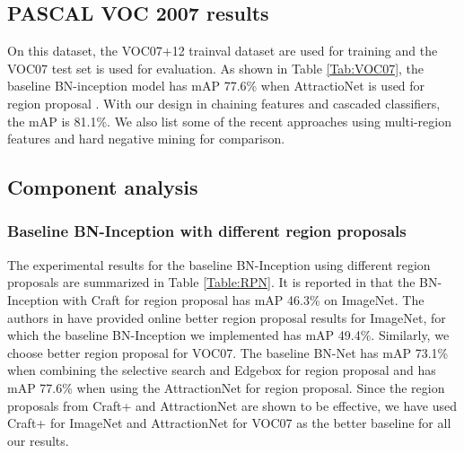 \documentclass[10pt,twocolumn,letterpaper]{article}
\begin{document}
\subsection{PASCAL VOC 2007 results}
On this dataset, the VOC07+12 trainval dataset are used for training and the VOC07 test set is used for evaluation. As shown in Table \ref{Tab:VOC07}, the baseline BN-inception model has mAP 77.6\% when AttractioNet is used for region proposal \cite{gidaris2016attend}. With our design in chaining features and cascaded classifiers, the mAP is 81.1\%. We also list some of the recent approaches  using multi-region features \cite{gidaris2015object} and hard negative mining \cite{shrivastava2016training} for comparison.


\subsection{Component analysis}
\subsubsection{Baseline BN-Inception with different region proposals}
The experimental results for the baseline BN-Inception using different region proposals are summarized in Table \ref{Table:RPN}. It is reported in \cite{zeng2016gated} that the BN-Inception with Craft \cite{yang2016craft}  for region proposal has mAP 46.3\% on ImageNet. The authors in \cite{yang2016craft} have provided online better region proposal results for ImageNet, for which the baseline BN-Inception we implemented has mAP 49.4\%. Similarly, we choose better region proposal for VOC07. The baseline BN-Net has mAP 73.1\% when combining the selective search \cite{Smeulders:SelectiveSearch} and Edgebox \cite{ZitnickDollarECCV14edgeBoxes} for region proposal  and has mAP 77.6\% when using the AttractionNet \cite{gidaris2016attend} for region proposal. Since the region proposals from Craft+ and AttractionNet are shown to be effective, we have used Craft+ for ImageNet and AttractionNet for VOC07 as the better baseline for all our results.

\begin{table}[]
\end{table}
\end{document}
